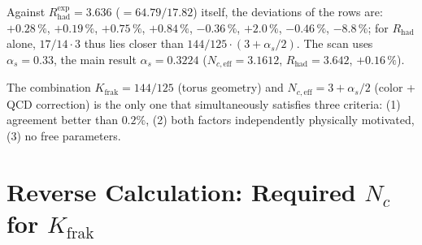 	\begin{table}[h]
		\centering
		\caption{Results of the systematic scan ($\alpha_s = 0.33$); the last column is the deviation of the lifetime ratio $\tau_\mu/\tau_\tau$. The combination $K_\text{frak} = 144/125$ with $N_{c,\text{eff}} = 3 + \alpha_s/2$ yields the best agreement here.}
		\label{tab:scan}
	\end{table}
	Against $R_\text{had}^\text{exp} = 3.636$ ($= 64.79/17.82$) itself, the deviations of the rows are: $+0.28\,\%$, $+0.19\,\%$, $+0.75\,\%$, $+0.84\,\%$, $-0.36\,\%$, $+2.0\,\%$, $-0.46\,\%$, $-8.8\,\%$; for $R_\text{had}$ alone, $17/14 \cdot 3$ thus lies closer than $144/125 \cdot (3+\alpha_s/2)$. The scan uses $\alpha_s = 0.33$, the main result $\alpha_s = 0.3224$ ($N_{c,\text{eff}} = 3.1612$, $R_\text{had} = 3.642$, $+0.16\,\%$).
	
	\begin{keypoint}
		The combination $K_\text{frak} = 144/125$ (torus geometry) and $N_{c,\text{eff}} = 3 + \alpha_s/2$ (color + QCD correction) is the only one that simultaneously satisfies three criteria: (1) agreement better than $0.2\%$, (2) both factors independently physically motivated, (3) no free parameters.
	\end{keypoint}
	
	
	\section{Reverse Calculation: Required $N_c$ for $K_\text{frak}$}
	
